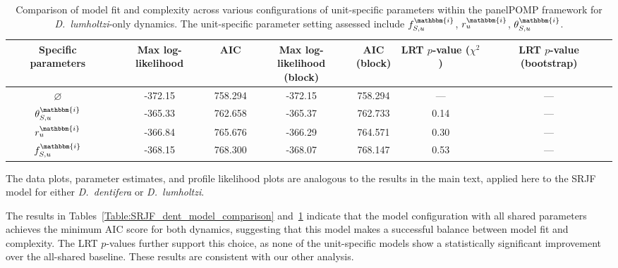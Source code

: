 \documentclass[aoas,preprint]{imsart}\usepackage[]{graphicx}\usepackage[]{xcolor}
\newcommand\unit{u}
\newcommand\invasive{\mathbbm{i}}
\begin{document}
\begin{table}[h!]
\centering
\begin{center}
\begin{tabular}{||c |c |c |c|c|c|c||}
 \hline
Specific parameters  & Max log-likelihood & AIC & \makecell[c]{Max log-likelihood\\(block)} & \makecell[c]{AIC\\(block)} & \makecell[c]{LRT\\$p$-value\\($\chi^2$)} & \makecell[c]{LRT\\$p$-value\\(bootstrap)}\\ [0.5ex]
 \hline\hline
$\varnothing$ & -372.15& 758.294& -372.15& 758.294 & --- & --- \\
$\theta^{\invasive}_{S,\unit}$  & -365.33& 762.658& -365.37& 762.733 & 0.14 & --- \\
$r^{\invasive}_{\unit}$ & -366.84& 765.676& -366.29& 764.571 & 0.30 & --- \\
$f^{\invasive}_{S,\unit}$ & -368.15& 768.300& -368.07& 768.147 & 0.53 & --- \\[1ex]
 \hline
\end{tabular}
\end{center}
\caption{Comparison of model fit and complexity across various configurations of unit-specific parameters within the panelPOMP framework for \textit{D.~lumholtzi}-only dynamics. The unit-specific parameter setting assessed include $f^{\invasive}_{S,\unit}$, $r^{\invasive}_{\unit}$, $\theta^{\invasive}_{S,\unit}$.}
\label{Table:SRJF_lum_model_comparison}
\end{table}

The data plots, parameter estimates, and profile likelihood plots are analogous to the results in the main text, applied here to the SRJF model for either \textit{D.~dentifera} or \textit{D.~lumholtzi}.

The results in Tables~\ref{Table:SRJF_dent_model_comparison} and~\ref{Table:SRJF_lum_model_comparison} indicate that the model configuration with all shared parameters achieves the minimum AIC score for both dynamics, suggesting that this model makes a successful balance between model fit and complexity.
The LRT $p$-values further support this choice, as none of the unit-specific models show a statistically significant improvement over the all-shared baseline.
These results are consistent with our other analysis.
\end{document}
